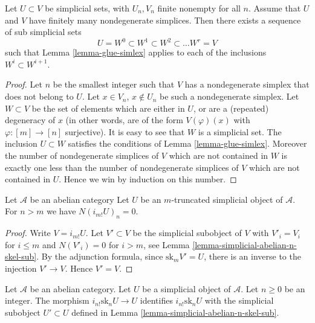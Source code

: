 \begin{lemma}
\label{lemma-add-simplices}
Let $U \subset V$ be simplicial sets, with $U_n, V_n$
finite nonempty for all $n$.
Assume that $U$ and $V$ have finitely many nondegenerate simplices.
Then there exists a sequence of sub simplicial sets
$$
U = W^0 \subset W^1 \subset W^2 \subset \ldots W^r = V
$$
such that Lemma \ref{lemma-glue-simlex} applies to each of
the inclusions $W^i \subset W^{i + 1}$.
\end{lemma}

\begin{proof}
Let $n$ be the smallest integer such that $V$ has a nondegenerate
simplex that does not belong to $U$. Let $x \in V_n$, $x\not \in U_n$
be such a nondegenerate simplex. Let $W \subset V$ be the set
of elements which are either in $U$, or are a (repeated) degeneracy
of $x$ (in other words, are of the form $V(\varphi)(x)$
with $\varphi : [m] \to [n]$ surjective). It is easy to see
that $W$ is a simplicial set. The
inclusion $U \subset W$ satisfies the conditions of Lemma
\ref{lemma-glue-simlex}. Moreover the number of nondegenerate
simplices of $V$ which are not contained in $W$ is exactly
one less than the number of nondegenerate
simplices of $V$ which are not contained in $U$.
Hence we win by induction on this number.
\end{proof}

\begin{lemma}
\label{lemma-imshriek-abelian}
Let $\mathcal{A}$ be an abelian category
Let $U$ be an $m$-truncated simplicial object of
$\mathcal{A}$. For $n > m$ we have $N(i_{m!}U)_n = 0$.
\end{lemma}

\begin{proof}
Write $V = i_{m!}U$. Let $V' \subset V$ be the
simplicial subobject of $V$ with $V'_i = V_i$ for $i \leq m$
and $N(V'_i) = 0$ for $i > m$,
see Lemma \ref{lemma-simplicial-abelian-n-skel-sub}.
By the adjunction formula,
since $\text{sk}_m V' = U$, there is an inverse to the
injection $V' \to V$. Hence $V' = V$.
\end{proof}

\begin{lemma}
\label{lemma-n-skeletion-abelian}
Let $\mathcal{A}$ be an abelian category.
Let $U$ be a simplicial object of $\mathcal{A}$.
Let $n \geq 0$ be an integer.
The morphism $i_{n!} \text{sk}_n U \to U$ identifies
$i_{n!} \text{sk}_n U$ with the simplicial subobject
$U' \subset U$ defined in Lemma \ref{lemma-simplicial-abelian-n-skel-sub}.
\end{lemma}

